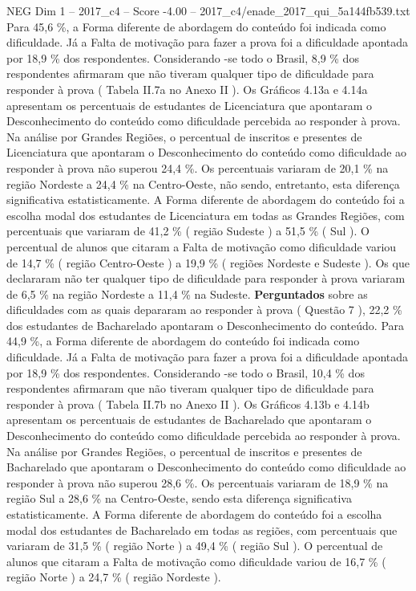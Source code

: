 \begin{textsample}{NEG Dim 1 – 2017\_c4 – Score -4.00 – 2017\_c4/enade\_2017\_qui\_5a144fb539.txt}
Para 45,6 \%, a Forma diferente de abordagem do conteúdo foi indicada como dificuldade.
Já a Falta de motivação para fazer a prova foi a dificuldade apontada por 18,9 \% dos respondentes.
Considerando -se todo o Brasil, 8,9 \% dos respondentes afirmaram que não tiveram qualquer tipo de dificuldade para responder à prova ( Tabela II.7a no Anexo II ).
Os Gráficos 4.13a e 4.14a apresentam os percentuais de estudantes de Licenciatura que apontaram o Desconhecimento do conteúdo como dificuldade percebida ao responder à prova.
Na análise por Grandes Regiões, o percentual de inscritos e presentes de Licenciatura que apontaram o Desconhecimento do conteúdo como dificuldade ao responder à prova não superou 24,4 \%.
Os percentuais variaram de 20,1 \% na região Nordeste a 24,4 \% na Centro-Oeste, não sendo, entretanto, esta diferença significativa estatisticamente.
A Forma diferente de abordagem do conteúdo foi a escolha modal dos estudantes de Licenciatura em todas as Grandes Regiões, com percentuais que variaram de 41,2 \% ( região Sudeste ) a 51,5 \% ( Sul ).
O percentual de alunos que citaram a Falta de motivação como dificuldade variou de 14,7 \% ( região Centro-Oeste ) a 19,9 \% ( regiões Nordeste e Sudeste ).
Os que declararam não ter qualquer tipo de dificuldade para responder à prova variaram de 6,5 \% na região Nordeste a 11,4 \% na Sudeste. \textbf{Perguntados} sobre as dificuldades com as quais depararam ao responder à prova ( Questão 7 ), 22,2 \% dos estudantes de Bacharelado apontaram o Desconhecimento do conteúdo.
Para 44,9 \%, a Forma diferente de abordagem do conteúdo foi indicada como dificuldade.
Já a Falta de motivação para fazer a prova foi a dificuldade apontada por 18,9 \% dos respondentes.
Considerando -se todo o Brasil, 10,4 \% dos respondentes afirmaram que não tiveram qualquer tipo de dificuldade para responder à prova ( Tabela II.7b no Anexo II ).
Os Gráficos 4.13b e 4.14b apresentam os percentuais de estudantes de Bacharelado que apontaram o Desconhecimento do conteúdo como dificuldade percebida ao responder à prova.
Na análise por Grandes Regiões, o percentual de inscritos e presentes de Bacharelado que apontaram o Desconhecimento do conteúdo como dificuldade ao responder à prova não superou 28,6 \%.
Os percentuais variaram de 18,9 \% na região Sul a 28,6 \% na Centro-Oeste, sendo esta diferença significativa estatisticamente.
A Forma diferente de abordagem do conteúdo foi a escolha modal dos estudantes de Bacharelado em todas as regiões, com percentuais que variaram de 31,5 \% ( região Norte ) a 49,4 \% ( região Sul ).
O percentual de alunos que citaram a Falta de motivação como dificuldade variou de 16,7 \% ( região Norte ) a 24,7 \% ( região Nordeste ).

\end{textsample}
